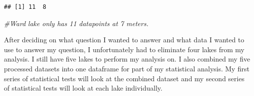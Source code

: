 \documentclass[12pt,]{article}
\newenvironment{Shaded}{\begin{snugshade}}{\end{snugshade}}
\newcommand{\KeywordTok}[1]{\textcolor[rgb]{0.13,0.29,0.53}{\textbf{#1}}}
\newcommand{\DataTypeTok}[1]{\textcolor[rgb]{0.13,0.29,0.53}{#1}}
\newcommand{\DecValTok}[1]{\textcolor[rgb]{0.00,0.00,0.81}{#1}}
\newcommand{\StringTok}[1]{\textcolor[rgb]{0.31,0.60,0.02}{#1}}
\newcommand{\CommentTok}[1]{\textcolor[rgb]{0.56,0.35,0.01}{\textit{#1}}}
\newcommand{\OperatorTok}[1]{\textcolor[rgb]{0.81,0.36,0.00}{\textbf{#1}}}
\newcommand{\NormalTok}[1]{#1}
\begin{document}
\begin{Shaded}
\end{Shaded}

\begin{verbatim}
## [1] 11  8
\end{verbatim}

\begin{Shaded}
\begin{Highlighting}[]
\CommentTok{#Ward lake only has 11 datapoints at 7 meters. }
\end{Highlighting}
\end{Shaded}

After deciding on what question I wanted to answer and what data I
wanted to use to answer my question, I unfortunately had to eliminate
four lakes from my analysis. I still have five lakes to perform my
analysis on. I also combined my five processed datasets into one
dataframe for part of my statistical analysis. My first series of
statistical tests will look at the combined dataset and my second series
of statistical tests will look at each lake individually.

\begin{Shaded}
\end{Shaded}
\end{document}
